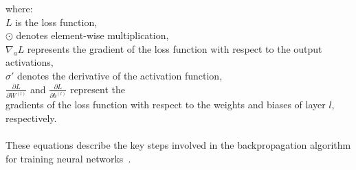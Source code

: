 \documentclass[12pt]{article}
\begin{document}
\begin{enumerate}
    where:\\
        \( L \) is the loss function,\\
        \( \odot \) denotes element-wise multiplication,\\
        \( \nabla_a L \) represents the gradient of the loss function with respect to the output activations,\\
        \( \sigma' \) denotes the derivative of the activation function,\\
        \( \frac{\partial L}{\partial W^{(l)}} \) and \( \frac{\partial L}{\partial b^{(l)}} \) represent the\\
        gradients of the loss function with respect to the weights and biases of layer \( l \), respectively.\\
    \\
    These equations describe the key steps involved in the backpropagation algorithm for training neural networks~\cite{WOS:000797637800002}.
    \end{enumerate}
\end{document}
